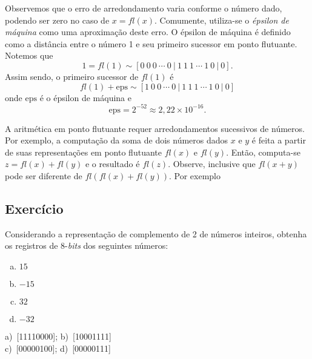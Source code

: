 Observemos que o erro de arredondamento varia conforme o número dado, podendo ser zero no caso de $x = fl(x)$. Comumente, utiliza-se o \emph{épsilon de máquina} como uma aproximação deste erro. O épsilon de máquina é definido como a distância entre o número 1 e seu primeiro sucessor em ponto flutuante. Notemos que
\begin{equation}
  1 = fl(1) \sim [0 ~ 0 ~ 0 ~ \cdots ~ 0 ~ | ~ 1 ~ 1 ~ 1 ~ \cdots ~ 1 ~ 0 ~ | ~ 0].
\end{equation}
Assim sendo, o primeiro sucessor de $fl(1)$ é
\begin{equation}
  fl(1)+\mathrm{eps} \sim [1 ~ 0 ~ 0 ~ \cdots ~ 0 ~ | ~ 1 ~ 1 ~ 1 ~ \cdots ~ 1 ~ 0 ~ | ~ 0]
\end{equation}
onde $\mathrm{eps}$ é o épsilon de máquina e
\begin{equation}
  \mathrm{eps} = 2^{-52} \approx 2,22\times 10^{-16}.
\end{equation}


A aritmética em ponto flutuante requer arredondamentos sucessivos de números. Por exemplo, a computação da soma de dois números dados $x$ e $y$ é feita a partir de suas representações em ponto flutuante $fl(x)$ e $fl(y)$. Então, computa-se $z = fl(x)+fl(y)$ e o resultado é $fl(z)$. Observe, inclusive que $fl(x+y)$ pode ser diferente de $fl(fl(x)+fl(y))$. Por exemplo


\subsection*{Exercício}

\begin{exer}
  Considerando a representação de complemento de 2 de números inteiros, obtenha os registros de $8$-{\it bits} dos seguintes números:
  \begin{enumerate}[a)]
  \item $15$
  \item $-15$
  \item $32$
  \item $-32$
  \end{enumerate}
\end{exer}
\begin{resp}

    a)~[11110000]; b)~[10001111]\\
    c)~[00000100]; d)~[00000111]
\end{resp}


